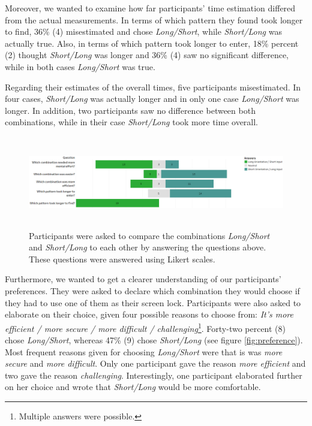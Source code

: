 Moreover, we wanted to examine how far participants' time estimation differed from the actual measurements. In terms of which pattern they found took longer to find, 36\% (4) misestimated and chose \textit{Long/Short}, while \textit{Short/Long} was actually true. Also, in terms of which pattern took longer to enter, 18\% percent (2) thought \textit{Short/Long} was longer and 36\% (4) saw no significant difference, while in both cases \textit{Long/Short} was true.

Regarding their estimates of the overall times, five participants misestimated. In four cases, \textit{Short/Long} was actually longer and in only one case \textit{Long/Short} was longer. In addition, two participants saw no difference between both combinations, while in their case \textit{Short/Long} took more time overall. \\

\begin{figure}[t!]
\centering
\includegraphics[width=15cm, height=4cm]{Chapters/graphics/Likert2.png}
\caption{Participants were asked to compare the combinations \textit{Long/Short} and \textit{Short/Long} to each other by answering the questions above. These questions were answered using Likert scales. }
\label{fig:likert2}
\end{figure}

Furthermore, we wanted to get a clearer understanding of our participants' preferences. They were asked to declare which combination they would choose if they had to use one of them as their screen lock. Participants were also asked to elaborate on their choice, given four possible reasons to choose from: \textit{It's more efficient / more secure / more difficult / challenging}\footnote{Multiple answers were possible.}.
Forty-two percent (8) chose \textit{Long/Short}, whereas 47\% (9) chose \textit{Short/Long} (see figure \ref{fig:preference}). Most frequent reasons given for choosing \textit{Long/Short} were that is was \textit{more secure} and \textit{more difficult}. Only one participant gave the reason \textit{more efficient} and two gave the reason \textit{challenging}. Interestingly, one participant elaborated further on her choice and wrote that \textit{Short/Long} would be more comfortable. \\

